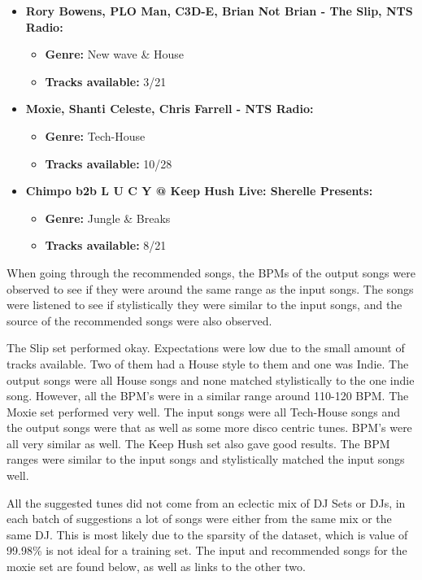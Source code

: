 \begin{itemize}
	\item \textbf{Rory Bowens, PLO Man, C3D-E, Brian Not Brian - The Slip, NTS Radio: } 
	\begin{itemize}
		\item \textbf{Genre:} New wave \& House
		\item \textbf{Tracks available:} 3/21
	\end{itemize}
	\item \textbf{Moxie, Shanti Celeste, Chris Farrell - NTS Radio: } 
	\begin{itemize}
		\item \textbf{Genre:} Tech-House
		\item \textbf{Tracks available:} 10/28
	\end{itemize}
	\item \textbf{Chimpo b2b L U C Y @ Keep Hush Live: Sherelle Presents:}
	\begin{itemize}
		\item \textbf{Genre:} Jungle \& Breaks
		\item \textbf{Tracks available:} 8/21
	\end{itemize}
	
\end{itemize}


When going through the recommended songs, the BPMs of the output songs were observed to see if they were around the same range as the input songs. The songs were listened to see if stylistically they were similar to the input songs, and the source of the recommended songs were also observed.

The Slip set performed okay. Expectations were low due to the small amount of tracks available. Two of them had a House style to them and one was Indie. The output songs were all House songs and none matched stylistically to the one indie song. However, all the BPM's were in a similar range around 110-120 BPM. The Moxie set performed very well. The input songs were all Tech-House songs and the output songs were that as well as some more disco centric tunes. BPM's were all very similar as well. The Keep Hush set also gave good results. The BPM ranges were similar to the input songs and stylistically matched the input songs well. 

All the suggested tunes did not come from an eclectic mix of DJ Sets or DJs, in each batch of suggestions a lot of songs were either from the same mix or the same DJ. This is most likely due to the sparsity of the dataset, which is value of 99.98\% is not ideal for a training set. The input and recommended songs for the moxie set are found below, as well as links to the other two.

